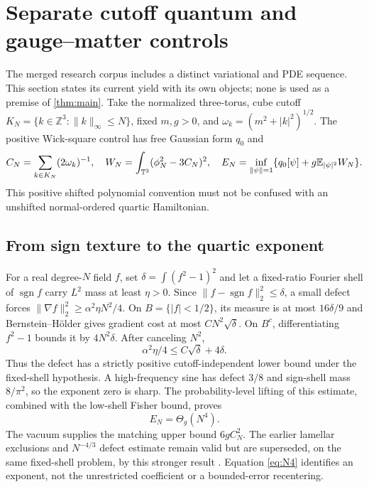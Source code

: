\section{Separate cutoff quantum and gauge--matter controls}
\label{sec:quantum}

The merged research corpus includes a distinct variational and PDE
sequence. This section states its current yield with its own objects;
none is used as a premise of \cref{thm:main}.
Take the normalized three-torus, cube cutoff
$K_N=\{k\in\mathbb Z^3:\|k\|_\infty\le N\}$, fixed $m,g>0$, and
$\omega_k=(m^2+|k|^2)^{1/2}$.
The positive Wick-square control has free Gaussian form $q_0$ and
\begin{equation}
 C_N=\sum_{k\in K_N}(2\omega_k)^{-1},\quad
 W_N=\int_{\mathbb T^3}(\phi_N^2-3C_N)^2,\quad
 E_N=\inf_{\|\psi\|=1}\{q_0[\psi]+g\mathbb E_{|\psi|^2}W_N\}.
 \label{eq:quantum-control}
\end{equation}
This positive shifted polynomial convention must not be confused with
an unshifted normal-ordered quartic Hamiltonian.

\subsection{From sign texture to the quartic exponent}
For a real degree-$N$ field $f$, set
$\delta=\int(f^2-1)^2$ and let a fixed-ratio Fourier shell of
$\operatorname{sgn}f$ carry $L^2$ mass at least $\eta>0$.
Since $\|f-\operatorname{sgn}f\|_2^2\le\delta$, a small defect forces
$\|\nabla f\|_2^2\ge\alpha^2\eta N^2/4$.
On $B=\{|f|<1/2\}$, its measure is at most $16\delta/9$ and
Bernstein--H\"older gives gradient cost at most $CN^2\sqrt\delta$.
On $B^c$, differentiating $f^2-1$ bounds it by $4N^2\delta$.
After canceling $N^2$,
\[
 \alpha^2\eta/4\le C\sqrt\delta+4\delta.
\]
Thus the defect has a strictly positive cutoff-independent lower bound
under the fixed-shell hypothesis. A high-frequency sine has defect
$3/8$ and sign-shell mass $8/\pi^2$, so the exponent zero is sharp.
The probability-level lifting of this estimate, combined with the
low-shell Fisher bound, proves
\begin{equation}
 E_N=\Theta_g(N^4).\label{eq:N4}
\end{equation}
The vacuum supplies the matching upper bound $6gC_N^2$.
The earlier lamellar exclusions and $N^{-4/3}$ defect estimate remain
valid but are superseded, on the same fixed-shell problem, by this
stronger result \cite{QuarticControl}.
Equation \eqref{eq:N4} identifies an exponent, not the unrestricted
coefficient or a bounded-error recentering.

